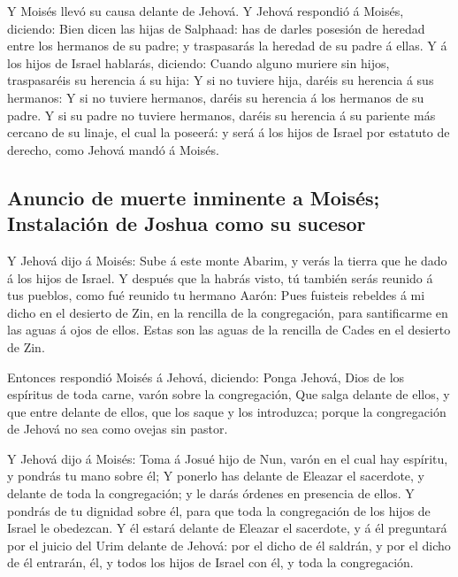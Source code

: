  Y Moisés llevó su causa delante de Jehová. 
Y Jehová respondió á Moisés, diciendo:  Bien dicen las
hijas de Salphaad: has de darles posesión de heredad entre los hermanos
de su padre; y traspasarás la heredad de su padre á ellas.
 Y á los hijos de Israel hablarás, diciendo: Cuando alguno
muriere sin hijos, traspasaréis su herencia á su hija:  Y
si no tuviere hija, daréis su herencia á sus hermanos:  Y
si no tuviere hermanos, daréis su herencia á los hermanos de su padre.
 Y si su padre no tuviere hermanos, daréis su herencia á
su pariente más cercano de su linaje, el cual la poseerá: y será á los
hijos de Israel por estatuto de derecho, como Jehová mandó á Moisés.

\hypertarget{anuncio-de-muerte-inminente-a-moisuxe9s-instalaciuxf3n-de-joshua-como-su-sucesor}{%
\subsection{Anuncio de muerte inminente a Moisés; Instalación de Joshua
como su
sucesor}\label{anuncio-de-muerte-inminente-a-moisuxe9s-instalaciuxf3n-de-joshua-como-su-sucesor}}

 Y Jehová dijo á Moisés: Sube á este monte Abarim, y
verás la tierra que he dado á los hijos de Israel.  Y
después que la habrás visto, tú también serás reunido á tus pueblos,
como fué reunido tu hermano Aarón:  Pues fuisteis
rebeldes á mi dicho en el desierto de Zin, en la rencilla de la
congregación, para santificarme en las aguas á ojos de ellos. Estas son
las aguas de la rencilla de Cades en el desierto de Zin.

 Entonces respondió Moisés á Jehová, diciendo:
 Ponga Jehová, Dios de los espíritus de toda carne, varón
sobre la congregación,  Que salga delante de ellos, y que
entre delante de ellos, que los saque y los introduzca; porque la
congregación de Jehová no sea como ovejas sin pastor.

 Y Jehová dijo á Moisés: Toma á Josué hijo de Nun, varón
en el cual hay espíritu, y pondrás tu mano sobre él;  Y
ponerlo has delante de Eleazar el sacerdote, y delante de toda la
congregación; y le darás órdenes en presencia de ellos. 
Y pondrás de tu dignidad sobre él, para que toda la congregación de los
hijos de Israel le obedezcan.  Y él estará delante de
Eleazar el sacerdote, y á él preguntará por el juicio del Urim delante
de Jehová: por el dicho de él saldrán, y por el dicho de él entrarán,
él, y todos los hijos de Israel con él, y toda la congregación.

